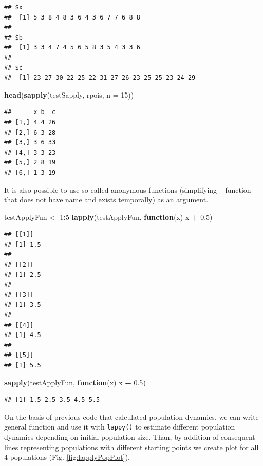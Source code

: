 \documentclass[]{book}
\newenvironment{Shaded}{\begin{snugshade}}{\end{snugshade}}
\newcommand{\KeywordTok}[1]{\textcolor[rgb]{0.13,0.29,0.53}{\textbf{#1}}}
\newcommand{\DataTypeTok}[1]{\textcolor[rgb]{0.13,0.29,0.53}{#1}}
\newcommand{\DecValTok}[1]{\textcolor[rgb]{0.00,0.00,0.81}{#1}}
\newcommand{\FloatTok}[1]{\textcolor[rgb]{0.00,0.00,0.81}{#1}}
\newcommand{\StringTok}[1]{\textcolor[rgb]{0.31,0.60,0.02}{#1}}
\newcommand{\ControlFlowTok}[1]{\textcolor[rgb]{0.13,0.29,0.53}{\textbf{#1}}}
\newcommand{\OperatorTok}[1]{\textcolor[rgb]{0.81,0.36,0.00}{\textbf{#1}}}
\newcommand{\NormalTok}[1]{#1}
\theoremstyle{definition}
\theoremstyle{definition}
\theoremstyle{definition}
\theoremstyle{remark}
\begin{document}
\begin{verbatim}
## $x
##  [1] 5 3 8 4 8 3 6 4 3 6 7 7 6 8 8
## 
## $b
##  [1] 3 3 4 7 4 5 6 5 8 3 5 4 3 3 6
## 
## $c
##  [1] 23 27 30 22 25 22 31 27 26 23 25 25 23 24 29
\end{verbatim}

\begin{Shaded}
\begin{Highlighting}[]
\KeywordTok{head}\NormalTok{(}\KeywordTok{sapply}\NormalTok{(testSapply, rpois, }\DataTypeTok{n =} \DecValTok{15}\NormalTok{))}
\end{Highlighting}
\end{Shaded}

\begin{verbatim}
##      x b  c
## [1,] 4 4 26
## [2,] 6 3 28
## [3,] 3 6 33
## [4,] 3 3 23
## [5,] 2 8 19
## [6,] 1 3 19
\end{verbatim}

It is also possible to use so called anonymous functions (simplifying --
function that does not have name and exists temporally) as an argument.

\begin{Shaded}
\begin{Highlighting}[]
\NormalTok{testApplyFun <-}\StringTok{ }\DecValTok{1}\OperatorTok{:}\DecValTok{5}
\KeywordTok{lapply}\NormalTok{(testApplyFun, }\ControlFlowTok{function}\NormalTok{(x) x }\OperatorTok{+}\StringTok{ }\FloatTok{0.5}\NormalTok{)}
\end{Highlighting}
\end{Shaded}

\begin{verbatim}
## [[1]]
## [1] 1.5
## 
## [[2]]
## [1] 2.5
## 
## [[3]]
## [1] 3.5
## 
## [[4]]
## [1] 4.5
## 
## [[5]]
## [1] 5.5
\end{verbatim}

\begin{Shaded}
\begin{Highlighting}[]
\KeywordTok{sapply}\NormalTok{(testApplyFun, }\ControlFlowTok{function}\NormalTok{(x) x }\OperatorTok{+}\StringTok{ }\FloatTok{0.5}\NormalTok{)}
\end{Highlighting}
\end{Shaded}

\begin{verbatim}
## [1] 1.5 2.5 3.5 4.5 5.5
\end{verbatim}

On the basis of previous code that calculated population dynamics, we
can write general function and use it with \texttt{lappy()} to estimate
different population dynamics depending on initial population size.
Than, by addition of consequent lines representing populations with
different starting points we create plot for all 4 populations (Fig.
\ref{fig:lapplyPopPlot}).
\end{document}
